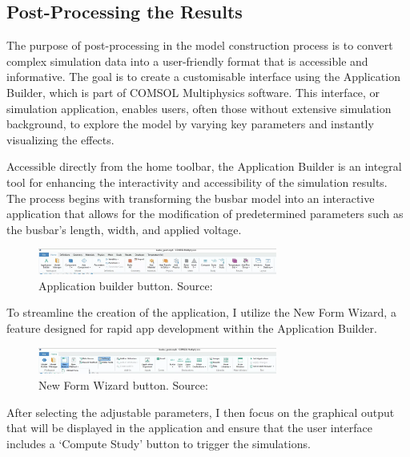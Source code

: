 \subsection{Post-Processing the Results}
The purpose of post-processing in the model construction process is to convert complex simulation data into a user-friendly format that is accessible and informative. The goal is to create a customisable interface using the Application Builder, which is part of COMSOL Multiphysics software. This interface, or simulation application, enables users, often those without extensive simulation background, to explore the model by varying key parameters and instantly visualizing the effects.

Accessible directly from the home toolbar, the Application Builder is an integral tool for enhancing the interactivity and accessibility of the simulation results. The process begins with transforming the busbar model into an interactive application that allows for the modification of predetermined parameters such as the busbar's length, width, and applied voltage.

\begin{figure}[H]
    \centering
    \includegraphics[width=0.7\textwidth]{Chapters/Figures/Chapter 3 Figures/Application Builder Button.png}
    \caption{Application builder button. Source: \cite{multiphysics__modeling_nodate}}
    \label{fig:application builder button}
\end{figure}

To streamline the creation of the application, I utilize the New Form Wizard, a feature designed for rapid app development within the Application Builder.

\begin{figure}[H]
    \centering
    \includegraphics[width=0.7\textwidth]{Chapters/Figures/Chapter 3 Figures/New Form Wizard Button.png}
    \caption{New Form Wizard button. Source: \cite{multiphysics__modeling_nodate}}
    \label{fig:New Form Wizard button}
\end{figure}

After selecting the adjustable parameters, I then focus on the graphical output that will be displayed in the application and ensure that the user interface includes a `Compute Study' button to trigger the simulations.

